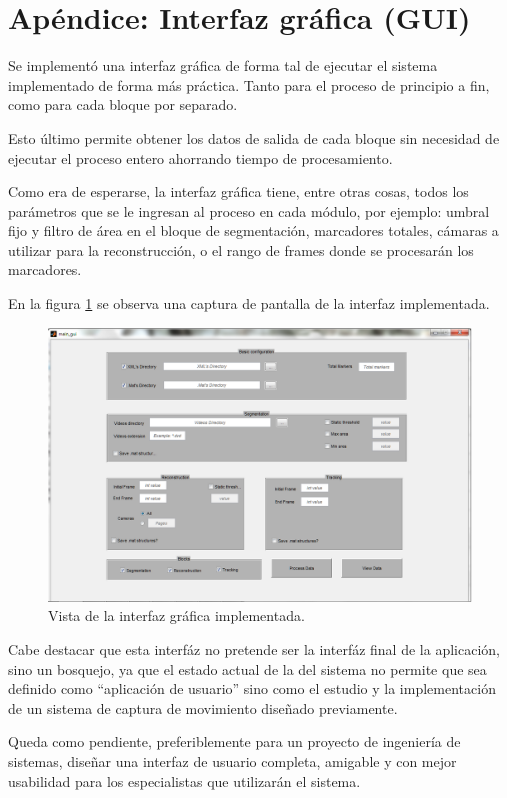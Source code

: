 \section{Apéndice: Interfaz gráfica (GUI)}

Se implementó una interfaz gráfica de forma tal de ejecutar el sistema implementado de forma más práctica. Tanto para el proceso de principio a fin, como para cada bloque por separado.

Esto último permite obtener los datos de salida de cada bloque sin necesidad de ejecutar el proceso entero ahorrando tiempo de procesamiento.

Como era de esperarse, la interfaz gráfica tiene, entre otras cosas, todos los parámetros que se le ingresan al proceso en cada módulo, por ejemplo: umbral fijo y filtro de área en el bloque de segmentación, marcadores totales, cámaras a utilizar para la reconstrucción, o el rango de frames donde se procesarán los marcadores.

En la figura \ref{guiVent} se observa una captura de pantalla de la interfaz implementada.

\begin{figure}[H]
\begin{center}
\includegraphics[scale=0.6]{img/gui.png}
\end{center}
\caption{Vista de la interfaz gráfica implementada.}
\label{guiVent}
\end{figure}

Cabe destacar que esta interfáz no pretende ser la interfáz final de la aplicación, sino un bosquejo, ya que el estado actual de la del sistema no permite que sea definido como ``aplicación de usuario'' sino como el estudio y la implementación de un sistema de captura de movimiento diseñado previamente.

Queda como pendiente, preferiblemente para un proyecto de ingeniería de sistemas, diseñar una interfaz de usuario completa, amigable y con mejor usabilidad para los especialistas que utilizarán el sistema.